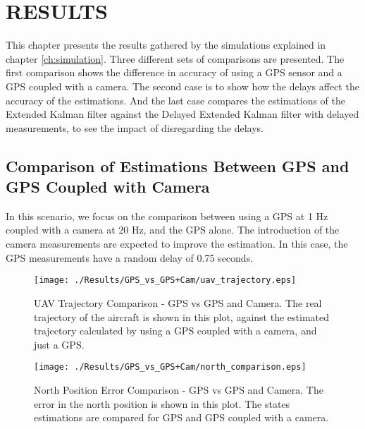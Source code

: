\chapter{RESULTS}
\label{ch:results}

This chapter presents the results gathered by the simulations explained in chapter \ref{ch:simulation}. Three different sets of comparisons are presented. The first comparison shows the difference in accuracy of using a GPS sensor and a GPS coupled with a camera. The second case is to show how the delays affect the accuracy of the estimations. And the last case compares the estimations of the Extended Kalman filter against the Delayed Extended Kalman filter with delayed measurements, to see the impact of disregarding the delays.

\section{Comparison of Estimations Between GPS and GPS Coupled with Camera}
In this scenario, we focus on the comparison between using a GPS at 1 Hz coupled with a camera at 20 Hz, and the GPS alone. The introduction of the camera measurements are expected to improve the estimation. In this case, the GPS measurements have a random delay of 0.75 seconds.
\begin{figure}[H]
  \centering
  \texttt{[image: ./Results/GPS\_vs\_GPS+Cam/uav\_trajectory.eps]}
  \caption[UAV Trajectory Comparison - GPS vs GPS and Camera]{UAV Trajectory Comparison - GPS vs GPS and Camera. The real trajectory of the aircraft is shown in this plot, against the estimated trajectory calculated by using a GPS coupled with a camera, and just a GPS.}
\end{figure}

\begin{figure}[H]
  \centering
  \texttt{[image: ./Results/GPS\_vs\_GPS+Cam/north\_comparison.eps]}
  \caption[North Position Error Comparison - GPS vs GPS and Camera]{North Position Error Comparison - GPS vs GPS and Camera. The error in the north position is shown in this plot. The states estimations are compared for GPS and GPS coupled with a camera.}
\end{figure}


